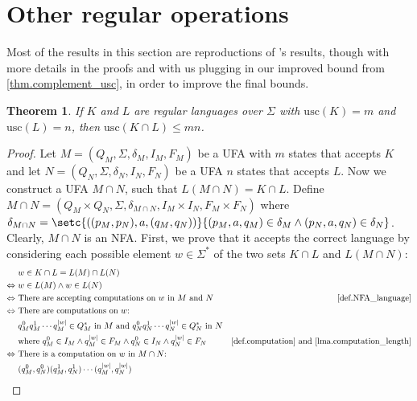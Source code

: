 \documentclass{report}
\DeclarePairedDelimiter{\abs}{\lvert}{\rvert}
\newtheorem{theorem}{Theorem}[section]
\theoremstyle{definition}
\begin{document}
\section{Other regular operations}

Most of the results in this section are reproductions of \cite{UFA_UB}'s results,
though with more details in the proofs and with us plugging in our improved bound
from \cref{thm.complement_usc}, in order to improve the final bounds.

\begin{theorem} \label{thm.intersection_usc}
If $K$ and $L$ are regular languages over $\Sigma$ with $\mathrm{usc}(K) = m$ and
$\mathrm{usc}(L) = n$, then $\mathrm{usc}(K \cap L) \leq mn$.
\end{theorem}

\begin{proof}
Let $M = (Q_M, \Sigma, \delta_M, I_M, F_M)$ be a UFA with $m$ states that accepts
$K$ and let $N = (Q_N, \Sigma, \delta_N, I_N, F_N)$ be a UFA $n$ states that
accepts $L$. Now we construct a UFA $M \cap N$, such that $L(M \cap N) = K \cap L$.
Define $M \cap N = (Q_M \times Q_N, \Sigma, \delta_{M \cap N}, I_M \times I_N,
F_M \times F_N)$ where $\delta_{M \cap N} = \setc{((p_M, p_N), a, (q_M, q_N))}
{(p_M, a, q_M) \in \delta_M \wedge (p_N, a, q_N) \in \delta_N}$.
Clearly, $M \cap N$ is an NFA. First, we prove that it accepts the correct language
by considering each possible element $w \in \Sigma^{\ast}$ of the two sets $K \cap L$
and $L(M \cap N)$:
\begin{align*}
& w \in K \cap L = L(M) \cap L(N) \\
\Leftrightarrow \ & w \in L(M) \wedge w \in L(N) \\
\Leftrightarrow \ & \text{There are accepting computations on } w
\text{ in } M \text{ and } N 
& \text{\cref{def.NFA_language}} \\
\Leftrightarrow \ & \text{There are computations on } w \text{:} \\
& q_M^0 q_M^1 \cdots q_M^{\abs{w}} \in Q_M^{\ast} \text{ in } M \text{ and }
q_N^0 q_N^1 \cdots q_N^{\abs{w}} \in Q_N^{\ast} \text{ in } N \\
& \text{where } q_M^0 \in I_M \wedge q_M^{\abs{w}} \in F_M \wedge
q_N^0 \in I_N \wedge q_N^{\abs{w}} \in F_N
& \text{\cref{def.computation} and \cref{lma.computation_length}} \\
\Leftrightarrow \ & \text{There is a computation on } w \text{ in } M \cap N
\text{:} \\
& (q_M^0, q_N^0) (q_M^1, q_N^1) \cdots (q_M^{\abs{w}}, q_N^{\abs{w}})

\end{align*}
\end{proof}
\end{document}
